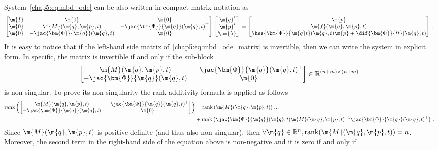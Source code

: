 %
System~\eqref{chap5:eq:mbd_ode} can be also written in compact matrix notation as
%
\begin{equation}
  \label{chap5:eq:mbd_ode_matrix}
  \begin{bmatrix}
    \m{I} & \m{0} & \m{0} \\
    \m{0}      & \m{M}(\m{q}, \m{p}, t) & -\jac{\bm{\Phi}}{\m{q}}(\m{q}, t)^{\top} \\
    \m{0}      & -\jac{\bm{\Phi}}{\m{q}}(\m{q}, t) & \m{0}
  \end{bmatrix}
  \begin{bmatrix}
    \m{q}^{\prime} \\
    \m{p}^{\prime} \\
    \bm{\lambda}
  \end{bmatrix}
  =
  \begin{bmatrix}
    \m{p} \\
    \m{f}(\m{q},\m{p},t) \\
    \hes{\bm{\Phi}}{\m{q}t}(\m{q}, t)\m{p} + \dif{\bm{\Phi}}{tt}(\m{q}, t)
  \end{bmatrix} \, \text{.}
\end{equation}
%
It is easy to notice that if the left-hand side matrix of~\eqref{chap5:eq:mbd_ode_matrix} is invertible, then we can write the system in explicit form. In specific, the matrix is invertible if and only if the sub-block
%
\begin{equation*}
  \begin{bmatrix}
    \m{M}(\m{q}, \m{p}, t) & -\jac{\bm{\Phi}}{\m{q}}(\m{q}, t)^{\top} \\
    -\jac{\bm{\Phi}}{\m{q}}(\m{q}, t) & \m{0}
  \end{bmatrix}
  \in\mathbb{R}^{(n+m)\times(n+m)}
\end{equation*}
%
is non-singular. To prove its non-singularity the rank additivity formula is applied as follows
%
\begin{align*}
  \mathrm{rank}\left(
  \begin{bmatrix}
    \m{M}(\m{q}, \m{p}, t) & -\jac{\bm{\Phi}}{\m{q}}(\m{q}, t)^{\top} \\
    -\jac{\bm{\Phi}}{\m{q}}(\m{q}, t) & \m{0}
  \end{bmatrix}\right)
  &= \mathrm{rank}\left(\m{M}(\m{q}, \m{p}, t)\right) \dots \\
  &+ \mathrm{rank}\left( \jac{\bm{\Phi}}{\m{q}}(\m{q}, t)\m{M}(\m{q}, \m{p}, t)^{-1} \jac{\bm{\Phi}}{\m{q}}(\m{q}, t)^{\top}\right) \, \text{.}
\end{align*}
%
Since $\m{M}(\m{q}, \m{p}, t)$ is positive definite (and thus also non-singular), then $\forall\m{q} \in \mathbb{R}^{n}, \mathrm{rank}({\m{M}(\m{q}, \m{p}, t)}) = n$. Moreover, the second term in the right-hand side of the equation above is non-negative and it is zero if and only if
